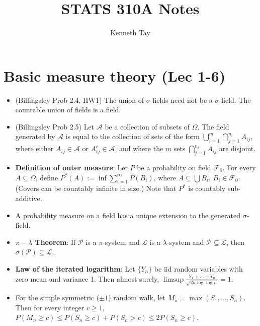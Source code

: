 \documentclass[twoside]{article}
\newcommand{\dis}{\displaystyle}
\newcommand\calA{\mathcal{A}}
\newcommand\calF{\mathcal{F}}
\newcommand\calL{\mathcal{L}}
\newcommand\calP{\mathcal{P}}
\newcommand\lmb{\lambda}
\newcommand\Om{\Omega}
\newcommand\sg{\sigma}
\begin{document}
\title{STATS 310A Notes}
\author{Kenneth Tay}
\date{\vspace{-3ex}}
\maketitle

\section*{Basic measure theory (Lec 1-6)}
\begin{itemize}
\item (Billingsley Prob 2.4, HW1) The union of $\sg$-fields need not be a $\sg$-field. The countable union of fields is a field.

\item (Billingsley Prob 2.5) Let $\calA$ be a collection of subsets of $\Om$. The field generated by $\calA$ is equal to the collection of sets of the form $\dis\bigcup_{i=1}^m\bigcap_{j=1}^{n_i} A_{ij}$, where either $A_{ij} \in \calA$ or $A_{ij}^c \in \calA$, and where the $m$ sets $\bigcap_{j=1}^{n_i} A_{ij}$ are disjoint.

\item \textbf{Definition of outer measure}: Let $P$ be a probability on field $\calF_0$. For every $A \subseteq \Om$, define $P^*(A) := \inf \displaystyle\sum_{i=1}^\infty P(B_i)$, where $A \subseteq \displaystyle\bigcup B_i$, $B_i \in \calF_0$. (Covers can be countably infinite in size.) Note that $P^*$ is countably sub-additive.

\item A probability measure on a field has a unique extension to the generated $\sg$-field.

\item \textbf{$\pi-\lmb$ Theorem}: If $\calP$ is a $\pi$-system and $\calL$ is a $\lmb$-system and $\calP \subseteq \calL$, then $\sg(\calP) \subseteq \calL$.

\item \textbf{Law of the iterated logarithm}: Let $\{ Y_n \}$ be iid random variables with zero mean and variance 1. Then almost surely, $\limsup \displaystyle\frac{Y_1 + \dots + Y_n}{\sqrt{2n \log \log n}} = 1$.

\item For the simple symmetric ($\pm 1$) random walk, let $M_n = \max (S_1, \dots, S_n)$. Then for every integer $c \geq 1$, $P (M_n \geq c) \leq P (S_n \geq c) + P (S_n > c) \leq 2 P (S_n \geq c)$.


\end{itemize}
\end{document}
